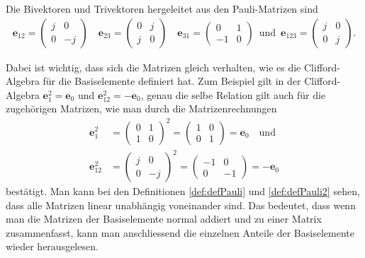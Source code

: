 \begin{definition} \label{def:defPauli2} 
	Die Bivektoren und Trivektoren hergeleitet aus den Pauli-Matrizen sind
	\begin{align} \label{Pauli2}
	\mathbf{e}_{12} =  
	\begin{pmatrix}
	j & 0 \\
	0 & -j
	\end{pmatrix}\quad
	\mathbf{e}_{23} =
	\begin{pmatrix}
	0 & j \\
	j & 0
	\end{pmatrix}\quad
	\mathbf{e}_{31} =
	\begin{pmatrix}
	0 & 1 \\
	-1 & 0
	\end{pmatrix}\enspace\text{und}\enspace
	\mathbf{e}_{123} =
	\begin{pmatrix}
	j & 0 \\
	0 & j
	\end{pmatrix}.
	\end{align}
\end{definition}
Dabei ist wichtig, dass sich die Matrizen gleich verhalten, wie es die Clifford-Algebra für die Basiselemente definiert hat. Zum Beispiel gilt in der Clifford-Algebra $\mathbf{e}_1^2=\mathbf{e}_0$ und $\mathbf{e}_{12}^2=-\mathbf{e}_0$, genau die selbe Relation gilt auch für die zugehörigen Matrizen, wie man durch die Matrizenrechnungen
\begin{align}
\mathbf{e}_1^2 &=
\begin{pmatrix}
0 & 1 \\
1 & 0
\end{pmatrix}^2 = 
\begin{pmatrix}
1 & 0 \\
0 & 1
\end{pmatrix}= \mathbf{e}_0 \quad\text{und}\\
\mathbf{e}_{12}^2 &=
\begin{pmatrix}
j & 0 \\
0 & -j
\end{pmatrix}^2 = 
\begin{pmatrix}
-1 & 0 \\
0 & -1
\end{pmatrix} = -\mathbf{e}_0 
\end{align}
bestätigt. Man kann bei den Definitionen \ref{def:defPauli} und \ref{def:defPauli2} sehen, dass alle Matrizen linear unabhängig voneinander sind. Das bedeutet, dass wenn man die Matrizen der Basiselemente normal addiert und zu einer Matrix zusammenfasst, kann man anschliessend die einzelnen Anteile der Basiselemente wieder herausgelesen.
